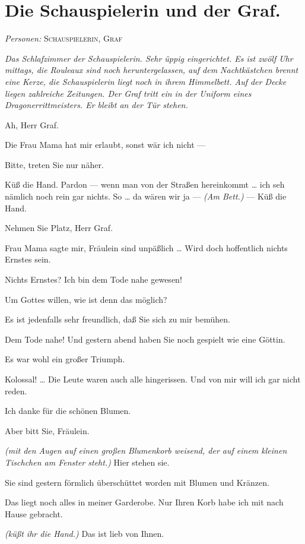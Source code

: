 \documentclass[
	final,
	a4paper,
	ngerman,
	mpinclude = true, %
	twoside = true,
	open = right,
	cleardoublepage = plain,
	DIV = 13,
	BCOR = 1cm,
	titlepage = firstiscover,
	]{scrbook}
\newcommand{\scene}{\section}
\newcommand{\direction}[1]{\textit{(#1)}}
\newcommand{\setting}[1]{\vspace{-0.5\baselineskip}\centering\textit{#1}}
\newcommand{\characterlist}[1]{{\begin{center}\textit{Personen:} #1\end{center}}}
\newcommand{\thecharacter}[1]{\textup{\textsc{#1}}\xspace}
\newcommand{\theschauspielerin}{\thecharacter{Schauspielerin}}
\newcommand{\thegraf}{\thecharacter{Graf}}
\newcommand{\character}[1]{\item[#1:]}
\newcommand{\schauspielerin}{\character{\theschauspielerin}}
\newcommand{\graf}{\character{\thegraf}}
\begin{document}
\scene{Die Schauspielerin und der Graf.}
\characterlist{\theschauspielerin, \thegraf}
\setting{Das Schlafzimmer der Schauspielerin. Sehr üppig eingerichtet. Es ist zwölf Uhr mittags, die Rouleaux sind noch heruntergelassen, auf dem Nachtkästchen brennt eine Kerze, die Schauspielerin liegt noch in ihrem Himmelbett. Auf der Decke liegen zahlreiche Zeitungen. Der Graf tritt ein in der Uniform eines Dragonerrittmeisters. Er bleibt an der Tür stehen.}
\begin{play}
	\schauspielerin
	Ah, Herr Graf.

	\graf
	Die Frau Mama hat mir erlaubt, sonst wär ich nicht ---

	\schauspielerin
	Bitte, treten Sie nur näher.

	\graf
	Küß die Hand. Pardon --- wenn man von der Straßen hereinkommt \ldots{} ich seh nämlich noch rein gar nichts. So \ldots{} da wären wir ja --- \direction{Am Bett.} --- Küß die Hand.

	\schauspielerin
	Nehmen Sie Platz, Herr Graf.

	\graf
	Frau Mama sagte mir, Fräulein sind unpäßlich \ldots{} Wird doch hoffentlich nichts Ernstes sein.

	\schauspielerin
	Nichts Ernstes? Ich bin dem Tode nahe gewesen!

	\graf
	Um Gottes willen, wie ist denn das möglich?

	\schauspielerin
	Es ist jedenfalls sehr freundlich, daß Sie sich zu mir bemühen.

	\graf
	Dem Tode nahe! Und gestern abend haben Sie noch gespielt wie eine Göttin.

	\schauspielerin
	Es war wohl ein großer Triumph.

	\graf
	Kolossal! \ldots{} Die Leute waren auch alle hingerissen. Und von mir will ich gar nicht reden.

	\schauspielerin
	Ich danke für die schönen Blumen.

	\graf
	Aber bitt Sie, Fräulein.

	\schauspielerin
	\direction{mit den Augen auf einen großen Blumenkorb weisend, der auf einem kleinen Tischchen am Fenster steht.} Hier stehen sie.

	\graf
	Sie sind gestern förmlich überschüttet worden mit Blumen und Kränzen.

	\schauspielerin
	Das liegt noch alles in meiner Garderobe. Nur Ihren Korb habe ich mit nach Hause gebracht.

	\graf
	\direction{küßt ihr die Hand.} Das ist lieb von Ihnen.


\end{play}
\end{document}
